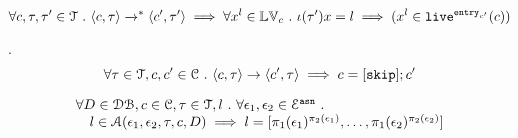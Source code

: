 %

\begin{lem}
\label{lem:inv_live}
\[
	\forall c, \mathtt{\tau}, \mathtt{\tau}' \in \mathcal{T} ~.~
	\langle c, \mathtt{\tau} \rangle \xrightarrow{}^* \langle c', \mathtt{\tau}' \rangle
	\implies
	\forall x^l \in \mathbb{LV}_c ~.~ \iota(\mathtt{\tau}') x = l \implies (x^l \in \mathtt{live}^{\mathtt{entry}_{c'}}(c))
\]
\end{lem}
%
\begin{lem}.
\label{lem:inv_skip}
\\
\[
	\forall \mathtt{\tau}\in \mathcal{T}, c, c' \in \mathcal{C} ~.~
	\langle c, \mathtt{\tau} \rangle \rightarrow \langle c', \mathtt{\tau} \rangle
	\implies 
	c = [\mathtt{skip}];c'
\]
\end{lem}
%
%
\begin{lem}
\label{lem:inv_alg1}
\[
\begin{array}{l}
    \forall D \in \mathcal{DB} , c \in \mathcal{C}, \mathtt{\tau} \in \mathcal{T}, l ~.~ \forall \mathtt{\epsilon}_1, \mathtt{\epsilon}_2 \in \mathcal{E}^{\mathtt{{asn}}} ~.~
  \\ \quad 
 l\in \mathcal{A}(\mathtt{\epsilon}_1, \mathtt{\epsilon}_2, \mathtt{\tau}, c, D)  \implies  l = [\pi_1(\mathtt{\epsilon}_1)^{\pi_2(\mathtt{\epsilon}_1)},\ldots, \pi_1(\mathtt{\epsilon}_2)^{\pi_2(\mathtt{\epsilon}_2)}]
\end{array}
\]
\end{lem}
